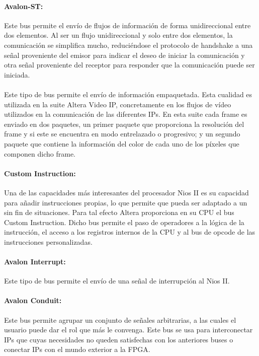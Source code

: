 \documentclass[a4paper,12pt,titlepage,final]{book}
\begin{document}
\paragraph{Avalon-ST:}
Este bus permite el envío de flujos de información de forma unidireccional entre dos elementos. Al ser un flujo unidireccional y solo entre dos elementos, la comunicación se simplifica mucho, reduciéndose el protocolo de handshake a una señal proveniente del emisor para indicar el deseo de iniciar la comunicación y otra señal proveniente del receptor para responder que la comunicación puede ser iniciada.

\paragraph{}
Este tipo de bus permite el envío de información empaquetada. Esta cualidad es utilizada en la suite Altera Video IP, concretamente en los flujos de vídeo utilizados en la comunicación de las diferentes IPs. En esta suite cada frame es enviado en dos paquetes, un primer paquete que proporciona la resolución del frame y si este se encuentra en modo entrelazado o progresivo; y un segundo paquete que contiene la información del color de cada uno de los píxeles que componen dicho frame. 

\paragraph{Custom Instruction:}
Una de las capacidades más interesantes del procesador Nios II es su capacidad para añadir instrucciones propias, lo que permite que pueda ser adaptado a un sin fin de situaciones. Para tal efecto Altera proporciona en su CPU el bus Custom Instruction. Dicho bus permite el paso de operadores a la lógica de la instrucción, el acceso a los registros internos de la CPU y al bus de opcode de las instrucciones personalizadas.  

\paragraph{Avalon Interrupt:}
Este tipo de bus permite el envío de una señal de interrupción al Nios II.
 
\paragraph{Avalon Conduit:}
Este bus permite agrupar un conjunto de señales arbitrarias, a las cuales el usuario puede dar el rol que más le convenga. Este bus se usa para interconectar IPs que cuyas necesidades no queden satisfechas con los anteriores buses o conectar IPs con el mundo exterior a la FPGA.
\end{document}

